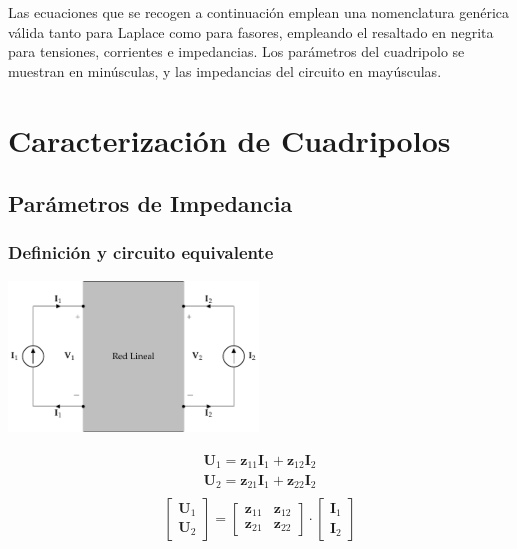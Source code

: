 \documentclass[10pt]{article}
\begin{document}
Las ecuaciones que se recogen a continuación emplean una nomenclatura genérica válida tanto para Laplace como para fasores, empleando el resaltado en negrita para tensiones, corrientes e impedancias. Los parámetros del cuadripolo se muestran en minúsculas, y las impedancias del circuito en mayúsculas.

\clearpage

\section{Caracterización de Cuadripolos}

\subsection{Parámetros de Impedancia}

\subsubsection*{Definición y circuito equivalente}


\begin{minipage}{0.5\textwidth}
\begin{center}
\includegraphics[height=4cm]{../figs/cuadripolo_fuentes_corriente.pdf}
\end{center}

\end{minipage}
\begin{minipage}{0.5\textwidth}
  \[
    \begin{array}{l}
      \mathbf{U}_1 = \mathbf{z}_{11} \mathbf{I}_1 + \mathbf{z}_{12} \mathbf{I}_2\\
      \mathbf{U}_2 = \mathbf{z}_{21} \mathbf{I}_1 + \mathbf{z}_{22} \mathbf{I}_2\\
    \end{array}
  \]
\[
  \left[
    \begin{array}{c}
      \mathbf{U}_1\\
      \mathbf{U}_2
    \end{array}
  \right] =
  \left[
    \begin{array}{cc}
      \mathbf{z}_{11} & \mathbf{z}_{12}\\
      \mathbf{z}_{21} & \mathbf{z}_{22}
    \end{array}
  \right] \cdot
  \left[
    \begin{array}{c}
      \mathbf{I}_1\\
      \mathbf{I}_2
    \end{array}
  \right]
\]
\end{minipage}
\end{document}
